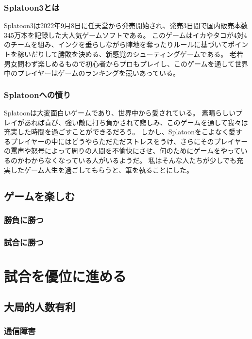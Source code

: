 \documentclass[a4paper,11pt]{jsbook}
\begin{document}
\subsection{Splatoon3とは}
Splatoon3は2022年9月8日に任天堂から発売開始され、発売3日間で国内販売本数345万本を記録した大人気ゲームソフトである。
このゲームはイカやタコが4対4のチームを組み、インクを垂らしながら陣地を奪ったりルールに基づいてポイントを稼いだりして勝敗を決める、新感覚のシューティングゲームである。
老若男女問わず楽しめるもので初心者からプロもプレイし、このゲームを通して世界中のプレイヤーはゲームのランキングを競いあっている。

\subsection{Splatoonへの憤り}
Splatoonは大変面白いゲームであり、世界中から愛されている。
素晴らしいプレイがあれば喜び、強い敵に打ち負かされて悲しみ、このゲームを通して我々は充実した時間を過ごすことができるだろう。
しかし、Splatoonをこよなく愛するプレイヤーの中にはどうやらただただストレスをうけ、さらにそのプレイヤーの罵声や怒号によって周りの人間を不愉快にさせ、何のためにゲームをやっているのかわからなくなっている人がいるようだ。
私はそんな人たちが少しでも充実したゲーム人生を過ごしてもらうと、筆を執ることにした。


\section{ゲームを楽しむ}


\subsection{勝負に勝つ}


\subsection{試合に勝つ}





\chapter{試合を優位に進める}
\section{大局的人数有利}
\subsection{通信障害}
\end{document}
